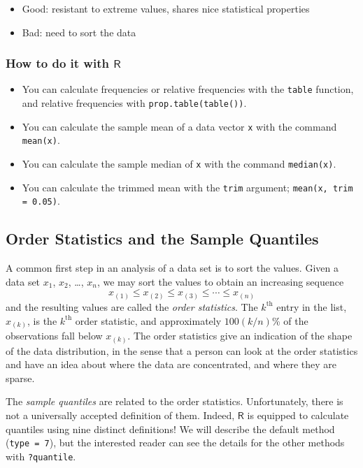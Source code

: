 \documentclass[10pt,english]{scrbook}
\begin{document}
\begin{itemize}
\item Good: resistant to extreme values, shares nice statistical properties
\item Bad: need to sort the data
\end{itemize}

\subsubsection[How to do it with \(\mathsf{R}\)]{How to do it with \(\mathsf{R}\)}
\label{sec-1-3-2-1}

\begin{itemize}
\item You can calculate frequencies or relative frequencies with the \texttt{table} function, and relative frequencies with \texttt{prop.table(table())}.
\item You can calculate the sample mean of a data vector \texttt{x} with the command \texttt{mean(x)}.
\item You can calculate the sample median of \texttt{x} with the command \texttt{median(x)}.
\item You can calculate the trimmed mean with the \texttt{trim} argument; \texttt{mean(x, trim = 0.05)}.
\end{itemize}
\subsection[Order Statistics and the Sample Quantiles]{Order Statistics and the Sample Quantiles}
\label{sec-1-3-3}

A common first step in an analysis of a data set is to sort the values. Given a data set \(x_{1}\), \(x_{2}\), \ldots{}, \(x_{n}\), we may sort the values to obtain an increasing sequence
\begin{equation} 
x_{(1)}\leq x_{(2)}\leq x_{(3)}\leq\cdots\leq x_{(n)}
\end{equation}
and the resulting values are called the \emph{order statistics}. The \(k^{\mathrm{th}}\) entry in the list, \(x_{(k)}\), is the \(k^{\mathrm{th}}\) order statistic, and approximately \(100(k/n)\)\% of the observations fall below \(x_{(k)}\). The order statistics give an indication of the shape of the data distribution, in the sense that a person can look at the order statistics and have an idea about where the data are concentrated, and where they are sparse.

The \emph{sample quantiles} are related to the order statistics. Unfortunately, there is not a universally accepted definition of them. Indeed, \(\mathsf{R}\) is equipped to calculate quantiles using nine distinct definitions! We will describe the default method (\texttt{type = 7}), but the interested reader can see the details for the other methods with \texttt{?quantile}.
\end{document}
